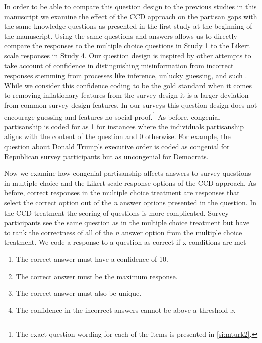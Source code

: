 \documentclass[12pt, letterpaper]{article}
\begin{document}
In order to be able to compare this question design to the previous studies in this manuscript we examine the effect of the CCD approach on the partisan gaps with the same knowledge questions as presented in the first study at the beginning of the manuscript. Using the same questions and answers allows us to directly compare the responses to the multiple choice questions in Study 1 to the Likert scale responses in Study 4. Our question design is inspired by other attempts to take account of confidence in distinguishing misinformation from incorrect responses stemming from processes like inference, unlucky guessing, and such  \citep[for instance,][]{pasek2015}. While we consider this confidence coding to be the gold standard when it comes to removing inflationary features from the survey design it is a larger deviation from common survey design features. In our surveys this question design does not encourage guessing and features no social proof.\footnote{The exact question wording for each of the items is presented in \cref{si:mturk2}.} As before, congenial partisanship is coded for as 1 for instances where the individuals partisanship aligns with the content of the question and 0 otherwise. For example, the question about Donald Trump's executive order is coded as congenial for Republican survey participants but as uncongenial for Democrats.

Now we examine how congenial partisanship affects answers to survey questions in multiple choice and the Likert scale response options of the CCD approach. As before, correct responses in the multiple choice treatment are responses that select the correct option out of the \emph{n} answer options presented in the question. In the CCD treatment the scoring of questions is more complicated. Survey participants see the same question as in the multiple choice treatment but have to rank the correctness of all of the \emph{n} answer option from the multiple choice treatment. We code a response to a question as correct if x conditions are met

\begin{enumerate}
  \item The correct answer must have a confidence of 10.
  \item The correct answer must be the maximum response.
  \item The correct answer must also be unique.
  \item The confidence in the incorrect answers cannot be above a threshold \emph{x}.
\end{enumerate}
\end{document}
